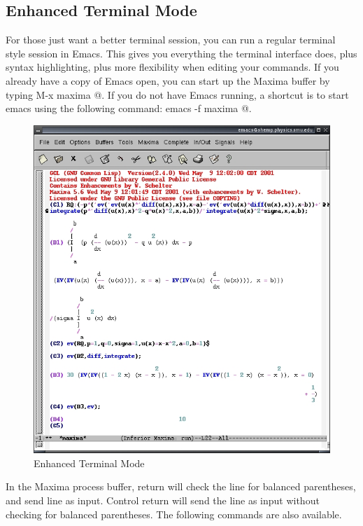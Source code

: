 \subsection{Enhanced Terminal Mode}

For those just want a better terminal session, you can run a regular terminal
style session in Emacs.  This gives you everything the 
terminal interface does, plus syntax highlighting, plus more flexibility when
editing your commands.  If you already have a copy of Emacs open, you can start
up the Maxima buffer by typing \verb@ M-x maxima @.  If you do not have Emacs
running, a shortcut is to start emacs using the following command: \verb@ emacs -f maxima @.  

\begin{figure}
\centering \includegraphics{images/emacsshot}
\caption{Enhanced Terminal Mode}
\end{figure}

In the Maxima process buffer,
return will check the line for balanced parentheses, and send line as input.
Control return will send the line as input without checking for balanced
parentheses.  The following commands are also available.

\smallskip

